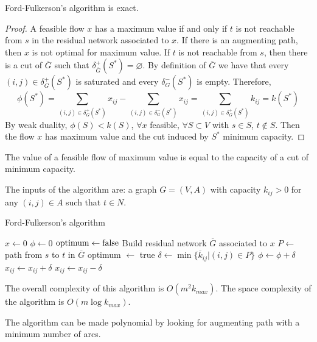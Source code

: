 \documentclass[12pt, a4paper]{report}
\newtheorem[style=M,bodystyle=\normalfont]{proposition}{Proposition}
\newtheorem[style=M,bodystyle=\normalfont]{theorem}{Theorem}
\newtheorem[style=M,bodystyle=\normalfont]{corollary}{Corollary}
\newtheorem[style=M,bodystyle=\normalfont]{lemma}{Lemma}
\newtheorem[style=M,bodystyle=\normalfont]{definition}{Definition}
\begin{document}
    \begin{proposition}
        Ford-Fulkerson's algorithm is exact. 
    \end{proposition}
    \begin{proof}
        A feasible flow $x$ has a maximum value if and only if $t$ is not reachable from $s$ in the residual network associated to $x$. If 
        there is an augmenting path, then $x$ is not optimal for maximum value. If $t$ is not reachable from $s$, then there is a cut of 
        $\overline{G}$ such that $\delta^{+}_{\overline{G}}(S^{*})=\varnothing$. By definition of $\overline{G}$ we have that every 
        $(i,j) \in \delta^{+}_{G}(S^{*})$ is saturated and every $\delta^{-}_{G}(S^{*})$ is empty. Therefore,
        \[\phi(S^{*})=\sum_{(i,j) \in \delta^{+}_{G}(S^{*})}{x_{ij}}-\sum_{(i,j) \in \delta^{-}_{G}(S^{*})}{x_{ij}}=
        \sum_{(i,j) \in \delta^{+}_{G}(S^{*})}{k_{ij}}=k(S^{*})\]
        By weak duality, $\phi(S) < k(S)$, $\forall x$ feasible, $\forall S \subset V$ with $s \in S$, $t \notin S$. Then the flow $x$ has
        maximum value and the cut induced by $S^{*}$ minimum capacity. 
    \end{proof}
    \begin{theorem}
        The value of a feasible flow of maximum value is equal to the capacity of a cut of minimum capacity.
    \end{theorem}
    The inputs of the algorithm are: a graph $G=(V,A)$ with capacity $k_{ij}>0$ for any $(i,j) \in A$ such that $t \in N$. 
    \begin{algorithm}[H]
        \caption{Ford-Fulkerson's algorithm}
            \begin{algorithmic}[1]
                \State $x \leftarrow 0$
                \State $\phi \leftarrow 0$
                \State $\textnormal{optimum} \leftarrow \textnormal{false}$
                    \State Build residual network $\overline{G}$ associated to $x$
                    \State $P \leftarrow$ path from $s$ to $t$ in $\overline{G}$
                        \State optimum $\leftarrow$ true
                    \Else
                        \State $\delta \leftarrow \min\{\overline{k}_{ij}|(i,j) \in P\}$
                        \State $\phi \leftarrow \phi + \delta$
                                \State $x_{ij} \leftarrow x_{ij}+\delta$
                            \Else 
                                \State $x_{ij} \leftarrow x_{ij}-\delta$
                            \EndIf
                        \EndFor
                    \EndIf
                \EndWhile
            \end{algorithmic}
    \end{algorithm}
    The overall complexity of this algorithm is $O(m^2k_{max})$. The space complexity of the algorithm is $O(m\log{k_{max}})$. 

    The algorithm can be made polynomial by looking for augmenting path with a minimum number of arcs. 

    
\end{document}
